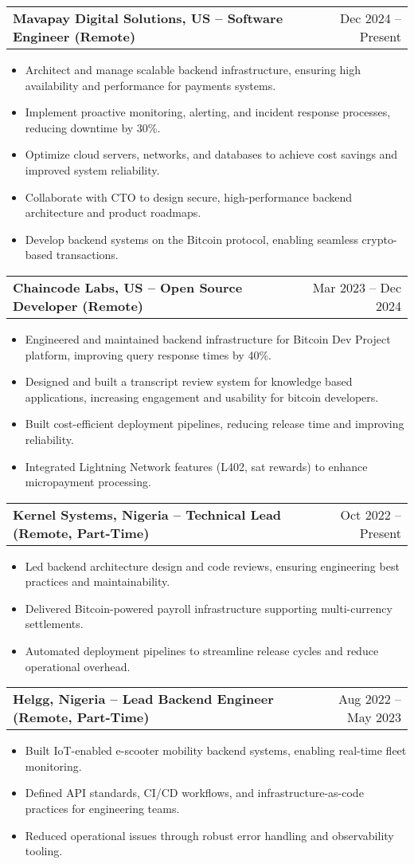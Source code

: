 \documentclass[a4paper,12pt]{article}
\makeatletter
\newenvironment{joblong}[2]
    {
    \begin{tabularx}{\linewidth}{@{}l X r@{}}
    \textbf{#1} & \hfill &  #2 \\[3.75pt]
    \end{tabularx}
    \begin{minipage}[t]{\linewidth}
    \begin{itemize}[nosep,after=\strut, leftmargin=1em, itemsep=3pt,label=--]
    }
    {
    \end{itemize}
    \end{minipage}    
    }
\makeatother
\begin{document}
\begin{joblong}{Mavapay Digital Solutions, US -- Software Engineer (Remote)}{Dec 2024 -- Present}
\item Architect and manage scalable backend infrastructure, ensuring high availability and performance for payments systems.
\item Implement proactive monitoring, alerting, and incident response processes, reducing downtime by 30\%.
\item Optimize cloud servers, networks, and databases to achieve cost savings and improved system reliability.
\item Collaborate with CTO to design secure, high-performance backend architecture and product roadmaps.
\item Develop backend systems on the Bitcoin protocol, enabling seamless crypto-based transactions.
\end{joblong}

\begin{joblong}{Chaincode Labs, US -- Open Source Developer (Remote)}{Mar 2023 -- Dec 2024}
\item Engineered and maintained backend infrastructure for Bitcoin Dev Project platform, improving query response times by 40\%.
\item Designed and built a transcript review system for knowledge based applications, increasing engagement and usability for bitcoin developers.
\item Built cost-efficient deployment pipelines, reducing release time and improving reliability.
\item Integrated Lightning Network features (L402, sat rewards) to enhance micropayment processing.
\end{joblong}

\begin{joblong}{Kernel Systems, Nigeria -- Technical Lead (Remote, Part-Time)}{Oct 2022 -- Present}
\item Led backend architecture design and code reviews, ensuring engineering best practices and maintainability.
\item Delivered Bitcoin-powered payroll infrastructure supporting multi-currency settlements.
\item Automated deployment pipelines to streamline release cycles and reduce operational overhead.
\end{joblong}

\begin{joblong}{Helgg, Nigeria -- Lead Backend Engineer (Remote, Part-Time)}{Aug 2022 -- May 2023}
\item Built IoT-enabled e-scooter mobility backend systems, enabling real-time fleet monitoring.
\item Defined API standards, CI/CD workflows, and infrastructure-as-code practices for engineering teams.
\item Reduced operational issues through robust error handling and observability tooling.
\end{joblong}
\end{document}
